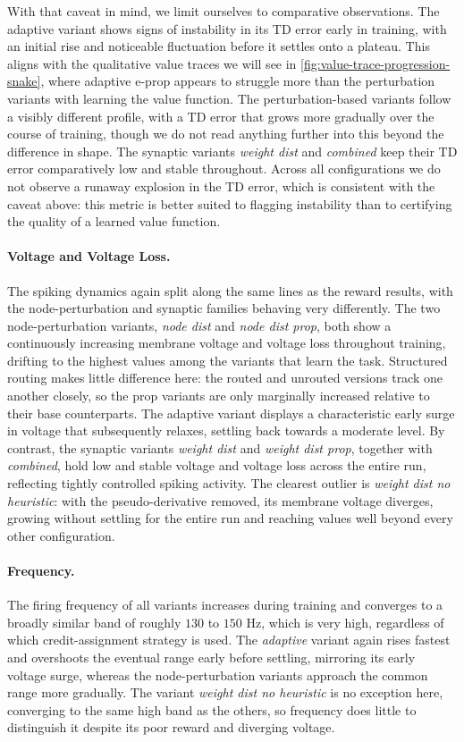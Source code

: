 With that caveat in mind, we limit ourselves to comparative observations. The adaptive
variant shows signs of instability in its TD error early in training, with an initial rise
and noticeable fluctuation before it settles onto a plateau. This aligns with the qualitative
value traces we will see in \ref{fig:value-trace-progression-snake}, where adaptive e-prop appears to struggle more
than the perturbation variants with learning the value function. The perturbation-based variants
follow a visibly different profile, with a TD error that grows more gradually over the course
of training, though we do not read anything further into this beyond the difference in shape.
The synaptic variants \emph{weight dist} and \emph{combined} keep their TD error
comparatively low and stable throughout. Across all configurations we do not observe a runaway
explosion in the TD error, which is consistent with the caveat above: this metric is better
suited to flagging instability than to certifying the quality of a learned value function.

\paragraph{Voltage and Voltage Loss.}
The spiking dynamics again split along the same lines as the reward results, with the
node-perturbation and synaptic families behaving very differently. The two node-perturbation
variants, \emph{node dist} and \emph{node dist prop}, both show a continuously increasing
membrane voltage and voltage loss throughout training, drifting to the highest values among
the variants that learn the task. Structured routing makes little difference here: the routed
and unrouted versions track one another closely, so the prop variants are only marginally
increased relative to their base counterparts. The adaptive variant displays a characteristic
early surge in voltage that subsequently relaxes, settling back towards a moderate level. By
contrast, the synaptic variants \emph{weight dist} and \emph{weight dist prop}, together
with \emph{combined}, hold low and stable voltage and voltage loss across the entire run,
reflecting tightly controlled spiking activity. The clearest outlier is \emph{weight dist no
heuristic}: with the pseudo-derivative removed, its membrane voltage diverges, growing without
settling for the entire run and reaching values well beyond every other configuration.

\paragraph{Frequency.}
The firing frequency of all variants increases during training and converges to a broadly
similar band of roughly $130$ to $150$ Hz, which is very high, regardless of which credit-assignment strategy is
used. The \emph{adaptive} variant again
rises fastest and overshoots the eventual range early before settling, mirroring its early
voltage surge, whereas the node-perturbation variants approach the common range more gradually. The variant \emph{weight dist no heuristic} is no exception here, converging to the same high band as the
others, so frequency does little to distinguish it despite its poor reward and diverging voltage.


